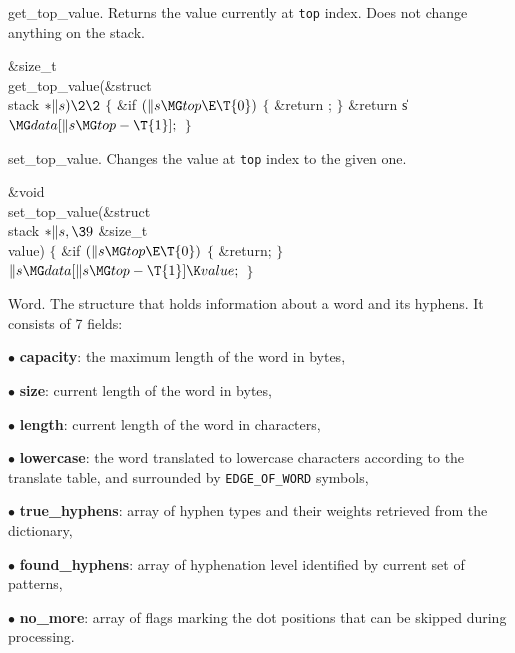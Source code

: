 get\_top\_value.
Returns the value currently at {\tt top} index. Does not change anything on the
stack.

\Y\B\1\1\&{size\_t} \\{get\_top\_value}(\&{struct} \\{stack} ${}{*}\|s)\2\2{}$\6
${}\{{}$\1\6
\&{if} ${}(\|s\MG\\{top}\E\T{0}){}$\5
${}\{{}$\1\6
\&{return} ;\6
\4${}\}{}$\2\6
\&{return} \|s${}\MG\\{data}[\|s\MG\\{top}-\T{1}];{}$\6
\4${}\}{}$\2\par
\fi

set\_top\_value.
Changes the value at {\tt top} index to the given one.

\Y\B\1\1\&{void} \\{set\_top\_value}(\&{struct} \\{stack} ${}{*}\|s,\39{}$%
\&{size\_t} \\{value})\2\2\6
${}\{{}$\1\6
\&{if} ${}(\|s\MG\\{top}\E\T{0}){}$\5
${}\{{}$\1\6
\&{return};\6
\4${}\}{}$\2\6
${}\|s\MG\\{data}[\|s\MG\\{top}-\T{1}]\K\\{value};{}$\6
\4${}\}{}$\2\par
\fi

Word.
The structure that holds information about a word and its hyphens. It consists
of 7 fields:

\item{$\bullet$} {\bf capacity}: the maximum length of the word in bytes,
\item{$\bullet$} {\bf size}: current length of the word in bytes,
\item{$\bullet$} {\bf length}: current length of the word in characters,
\item{$\bullet$} {\bf lowercase}: the word translated to lowercase characters
according to the translate table, and
surrounded by {\tt EDGE\_OF\_WORD} symbols,
\item{$\bullet$} {\bf true\_hyphens}: array of hyphen types and their weights
retrieved from the dictionary,
\item{$\bullet$} {\bf found\_hyphens}: array of hyphenation level identified by
current set of patterns,
\item{$\bullet$} {\bf no\_more}: array of flags marking the dot positions that
can be skipped during processing.


